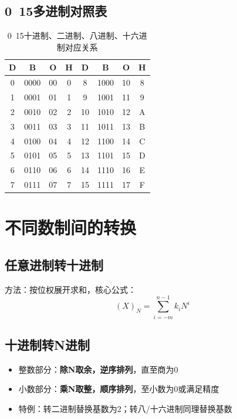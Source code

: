 \subsection{0~15多进制对照表}
\begin{table}[!htbp]
    \centering
    \setlength{\tabcolsep}{10pt}
    \renewcommand{\arraystretch}{1.3}
    \caption{0~15十进制、二进制、八进制、十六进制对应关系}
    \label{tab:num_0_15}
    \begin{tabular}{|c|c|c|c|c|c|c|c|}
        \hline
        D & B & O & H & D & B & O & H \\
        \hline
        0  & 0000 & 00 & 0 & 8  & 1000 & 10 & 8 \\
        1  & 0001 & 01 & 1 & 9  & 1001 & 11 & 9 \\
        2  & 0010 & 02 & 2 & 10 & 1010 & 12 & A \\
        3  & 0011 & 03 & 3 & 11 & 1011 & 13 & B \\
        4  & 0100 & 04 & 4 & 12 & 1100 & 14 & C \\
        5  & 0101 & 05 & 5 & 13 & 1101 & 15 & D \\
        6  & 0110 & 06 & 6 & 14 & 1110 & 16 & E \\
        7  & 0111 & 07 & 7 & 15 & 1111 & 17 & F \\
        \hline
    \end{tabular}
\end{table}

\section{不同数制间的转换}
\subsection{任意进制转十进制}
方法：按位权展开求和，核心公式：
\[
(X)_N=\sum_{i=-m}^{n-1}k_i N^i
\]

\subsection{十进制转N进制}
\begin{itemize}
    \item 整数部分：\textbf{除N取余，逆序排列}，直至商为0
    \item 小数部分：\textbf{乘N取整，顺序排列}，至小数为0或满足精度
    \item 特例：转二进制替换基数为2；转八/十六进制同理替换基数
\end{itemize}

